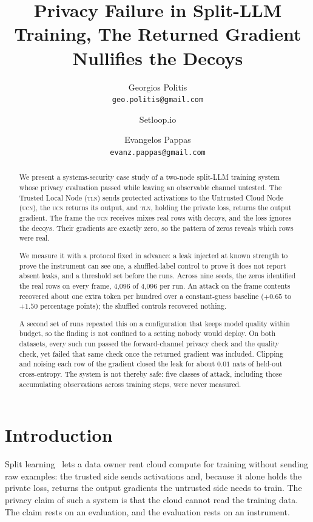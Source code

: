 \documentclass[11pt]{article}
\title{\textbf{Privacy Failure in Split-LLM Training, The Returned
Gradient Nullifies the Decoys}}
\author{Georgios Politis\\ {\small\texttt{geo.politis@gmail.com}} \and Setloop.io \and
  Evangelos Pappas\\ {\small\texttt{evanz.pappas@gmail.com}}}
\date{}
\newcommand{\tln}{\textsc{tln}}
\newcommand{\ucn}{\textsc{ucn}}
\begin{document}
\maketitle

\begin{abstract}
We present a systems-security case study of a two-node split-LLM training
system whose privacy evaluation passed while leaving an observable channel
untested. The Trusted Local Node (\tln) sends protected activations to the
Untrusted Cloud Node (\ucn), the \ucn{} returns its output, and \tln{}, holding
the private loss, returns the output gradient. The frame the \ucn{} receives mixes real rows
with decoys, and the loss ignores the decoys. Their gradients are exactly zero,
so the pattern of zeros reveals which rows were real.

We measure it with a protocol fixed in advance: a leak injected at known
strength to prove the instrument can see one, a shuffled-label control to prove
it does not report absent leaks, and a threshold set before the runs. Across
nine seeds, the zeros identified the real rows on every frame, 4,096 of 4,096
per run. An attack on the frame contents recovered about one extra token
per hundred over a constant-guess baseline ($+0.65$ to $+1.50$ percentage
points); the shuffled controls recovered nothing.

A second set of runs repeated this on a configuration that keeps model quality
within budget, so the finding is not confined to a setting nobody would deploy.
On both datasets, every such run passed the forward-channel privacy check and
the quality check, yet failed that same check once the returned gradient was
included. Clipping and noising each row of the gradient closed the leak for
about $0.01$ nats of held-out cross-entropy. The system is not thereby safe:
five classes of attack, including those accumulating observations across
training steps, were never measured.
\end{abstract}

\section{Introduction}

Split learning~\cite{vepakomma2018split} lets a data owner rent cloud compute for training without sending
raw examples: the trusted side sends activations and, because it alone holds the
private loss, returns the output gradients the untrusted side needs to train.
The privacy claim of such a system is that the cloud cannot read the
training data. The claim rests on an evaluation, and the evaluation rests on an
instrument.
\end{document}
